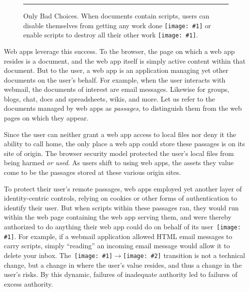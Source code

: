 \documentclass[letterpaper,twocolumn,10pt]{article}
\newcommand{\q}[1]{{\texttt{[image: \#1]}}}
\newcommand{\qq}[2]{{\texttt{[image: \#1]}}$\rightarrow${\texttt{[image: \#2]}}}
\begin{document}
\begin{figure}[t!]
  
\caption[Only Bad Choices.]{Only Bad Choices. When documents contain scripts, 
users can disable themselves from getting any work done \q{1} or enable 
scripts to destroy all their other work \q{2}. \\ } \hrule
  \label{fig:dialog}
\end{figure}

Web apps leverage this success. To the browser, the page on which a web app 
resides is a document, and the web app itself is simply active content within 
that document. But to the user, a web app is an application managing yet 
other documents on the user's behalf. For example, when the user interacts 
with webmail, the documents of interest are email messages. Likewise for 
groups, blogs, chat, docs and spreadsheets, wikis, and more. Let us refer to 
the documents managed by web apps as \emph{passages}, to distinguish them 
from the web pages on which they appear.

Since the user can neither grant a web app access to local files nor deny it 
the ability to call home, the only place a web app could store these passages 
is on its site of origin. The browser security model protected the user's 
local files from being harmed \emph{or used}. As users shift to using web 
apps, the assets they value come to be the passages stored at these various 
origin sites. 

To protect their user's remote passages, web apps employed yet another layer 
of identity-centric controls, relying on cookies or other forms of 
authentication to identify their user. But when scripts within these passages 
ran, they would run within the web page containing the web app serving them, 
and were thereby authorized to do anything their web app could do on behalf 
of its user~\q{4}. For example, if a webmail application allowed HTML email 
messages to carry scripts, simply ``reading'' an incoming email message would 
allow it to delete your inbox. The~\qq{3}{4} transition is not a technical 
change, but a change in where the user's value resides, and thus a change in 
the user's risks. By this dynamic, failures of inadequate authority led to 
failures of excess authority.
\end{document}
